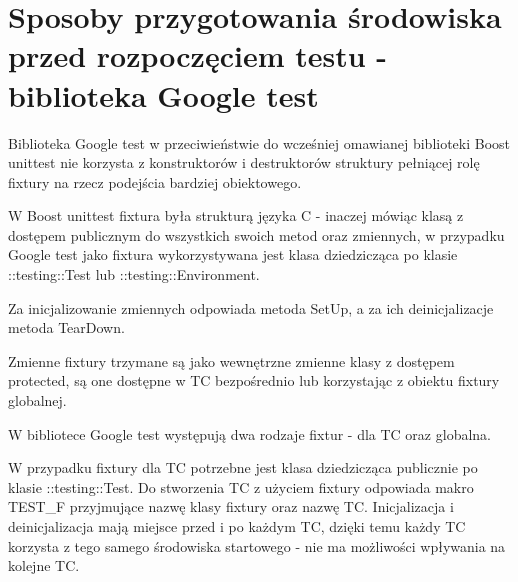 \documentclass[12pt,a4paper,notitlepage]{report}
\begin{document}
			

\section{Sposoby przygotowania środowiska przed rozpoczęciem testu - biblioteka Google test}

Biblioteka Google test w przeciwieństwie do wcześniej omawianej biblioteki Boost unittest nie korzysta z konstruktorów i destruktorów struktury pełniącej rolę fixtury na rzecz podejścia bardziej obiektowego.

W Boost unittest fixtura była strukturą języka C - inaczej mówiąc klasą z dostępem publicznym do wszystkich swoich metod oraz zmiennych, w przypadku Google test jako fixtura wykorzystywana jest klasa dziedzicząca po klasie ::testing::Test lub ::testing::Environment.

Za inicjalizowanie zmiennych odpowiada metoda SetUp, a za ich deinicjalizacje metoda TearDown.

Zmienne fixtury trzymane są jako wewnętrzne zmienne klasy z dostępem protected, są one dostępne w TC bezpośrednio lub korzystając z obiektu fixtury globalnej.

W bibliotece Google test występują dwa rodzaje fixtur - dla TC oraz globalna.

W przypadku fixtury dla TC potrzebne jest klasa dziedzicząca publicznie po klasie ::testing::Test. Do stworzenia TC z użyciem fixtury odpowiada makro TEST{\_}F przyjmujące nazwę klasy fixtury oraz nazwę TC. Inicjalizacja i deinicjalizacja mają miejsce przed i po każdym TC, dzięki temu każdy TC korzysta z tego samego środowiska startowego - nie ma możliwości wpływania na kolejne TC.

			
\end{document}
